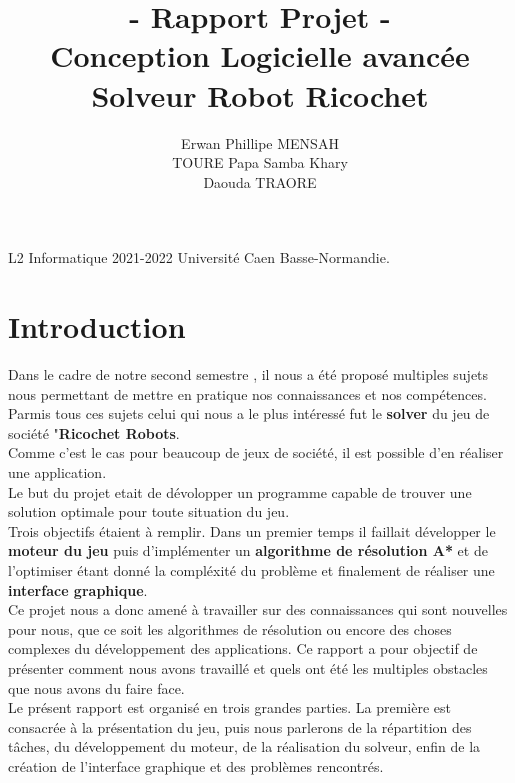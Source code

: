 \documentclass[12pt]{article}
\title{- Rapport Projet - \\Conception Logicielle avancée \\ \textbf{Solveur Robot Ricochet} }
\author{ Erwan Phillipe MENSAH \\ TOURE Papa Samba Khary \\Daouda TRAORE}
\date{}
\begin{document}
\maketitle
\mbox{}
\vfill
L2 Informatique 2021-2022 Université Caen Basse-Normandie.

\newpage
\tableofcontents
\newpage
\section{Introduction}	
	Dans le cadre de notre second semestre , il nous a été proposé multiples sujets nous permettant de mettre en
	pratique nos connaissances et nos compétences. Parmis tous ces sujets celui qui nous a le plus intéressé fut le \textbf{solver} du jeu de société "\textbf{Ricochet Robots}.
	\\
	Comme c’est le cas pour beaucoup de jeux de société, il est possible d'en réaliser une application. 
	\\
	Le but du projet etait de dévolopper un programme capable de trouver une solution optimale pour toute situation du jeu.
	\\
	Trois objectifs étaient à remplir. Dans un premier temps il faillait développer le \textbf{moteur du jeu} puis d'implémenter un \textbf{algorithme de résolution A*} et de l'optimiser étant
	donné la compléxité du problème et finalement de réaliser une \textbf{interface graphique}.
	\\
	Ce projet nous a donc amené à travailler sur des connaissances qui sont nouvelles pour
	nous, que ce soit les  algorithmes de résolution ou encore des choses complexes du développement des applications. Ce rapport a pour objectif de présenter comment nous avons travaillé et quels ont été les
	multiples obstacles que nous avons du faire face.
	\\
	Le présent rapport est organisé en trois grandes parties. La première est consacrée à la présentation du jeu, puis nous parlerons de la répartition des tâches, du développement du moteur,
	de la réalisation du solveur, enfin de la création  de l'interface graphique et des problèmes rencontrés.
\newpage
\end{document}
